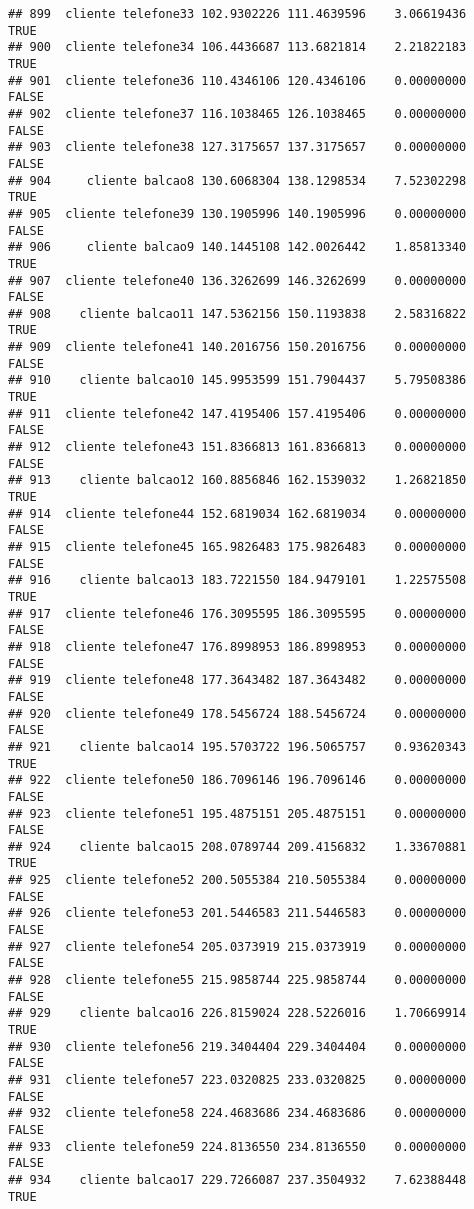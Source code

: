\documentclass[
]{article}
\begin{document}
\begin{verbatim}
## 899  cliente telefone33 102.9302226 111.4639596    3.06619436     TRUE
## 900  cliente telefone34 106.4436687 113.6821814    2.21822183     TRUE
## 901  cliente telefone36 110.4346106 120.4346106    0.00000000    FALSE
## 902  cliente telefone37 116.1038465 126.1038465    0.00000000    FALSE
## 903  cliente telefone38 127.3175657 137.3175657    0.00000000    FALSE
## 904     cliente balcao8 130.6068304 138.1298534    7.52302298     TRUE
## 905  cliente telefone39 130.1905996 140.1905996    0.00000000    FALSE
## 906     cliente balcao9 140.1445108 142.0026442    1.85813340     TRUE
## 907  cliente telefone40 136.3262699 146.3262699    0.00000000    FALSE
## 908    cliente balcao11 147.5362156 150.1193838    2.58316822     TRUE
## 909  cliente telefone41 140.2016756 150.2016756    0.00000000    FALSE
## 910    cliente balcao10 145.9953599 151.7904437    5.79508386     TRUE
## 911  cliente telefone42 147.4195406 157.4195406    0.00000000    FALSE
## 912  cliente telefone43 151.8366813 161.8366813    0.00000000    FALSE
## 913    cliente balcao12 160.8856846 162.1539032    1.26821850     TRUE
## 914  cliente telefone44 152.6819034 162.6819034    0.00000000    FALSE
## 915  cliente telefone45 165.9826483 175.9826483    0.00000000    FALSE
## 916    cliente balcao13 183.7221550 184.9479101    1.22575508     TRUE
## 917  cliente telefone46 176.3095595 186.3095595    0.00000000    FALSE
## 918  cliente telefone47 176.8998953 186.8998953    0.00000000    FALSE
## 919  cliente telefone48 177.3643482 187.3643482    0.00000000    FALSE
## 920  cliente telefone49 178.5456724 188.5456724    0.00000000    FALSE
## 921    cliente balcao14 195.5703722 196.5065757    0.93620343     TRUE
## 922  cliente telefone50 186.7096146 196.7096146    0.00000000    FALSE
## 923  cliente telefone51 195.4875151 205.4875151    0.00000000    FALSE
## 924    cliente balcao15 208.0789744 209.4156832    1.33670881     TRUE
## 925  cliente telefone52 200.5055384 210.5055384    0.00000000    FALSE
## 926  cliente telefone53 201.5446583 211.5446583    0.00000000    FALSE
## 927  cliente telefone54 205.0373919 215.0373919    0.00000000    FALSE
## 928  cliente telefone55 215.9858744 225.9858744    0.00000000    FALSE
## 929    cliente balcao16 226.8159024 228.5226016    1.70669914     TRUE
## 930  cliente telefone56 219.3404404 229.3404404    0.00000000    FALSE
## 931  cliente telefone57 223.0320825 233.0320825    0.00000000    FALSE
## 932  cliente telefone58 224.4683686 234.4683686    0.00000000    FALSE
## 933  cliente telefone59 224.8136550 234.8136550    0.00000000    FALSE
## 934    cliente balcao17 229.7266087 237.3504932    7.62388448     TRUE

\end{verbatim}
\end{document}
